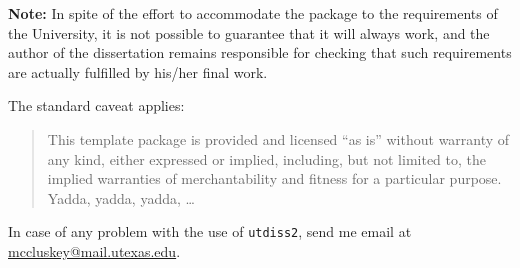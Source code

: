 \textbf{Note:} In spite of the effort to accommodate the package to
the requirements of the University, it is not possible to guarantee
that it will always work, and the author of the dissertation remains
responsible for checking that such requirements are actually fulfilled
by his/her final work. 

The standard caveat applies:

\begin{quote}
%
This template package is provided and licensed ``as is'' without warranty
of any kind, either expressed or implied, including, but not limited to,
the implied warranties of merchantability and fitness for a particular
purpose. Yadda, yadda, yadda, \ldots
\end{quote}

In case of any problem with the use of \texttt{utdiss2}, send me email
at \url{mccluskey@mail.utexas.edu}.
